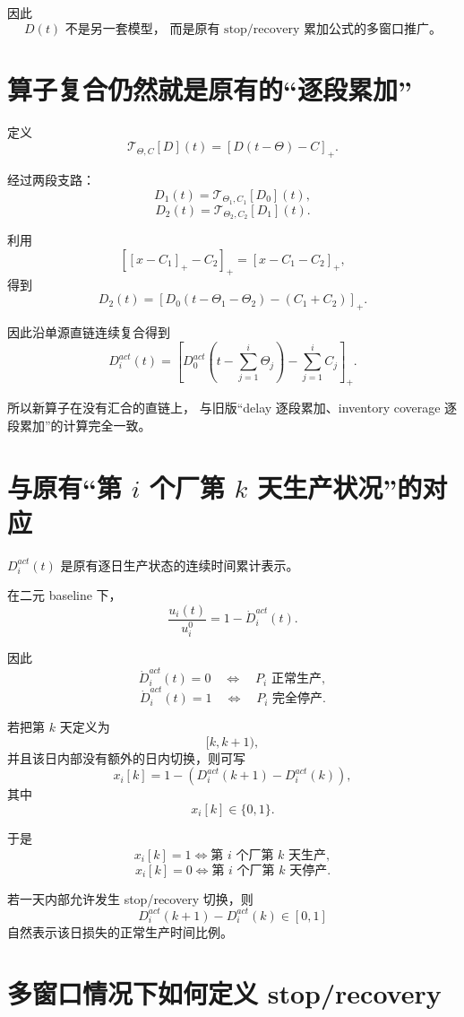 \documentclass[UTF8,11pt]{ctexart}
\begin{document}
因此
\[
\boxed{
\text{\(D(t)\) 不是另一套模型，
而是原有 stop/recovery 累加公式的多窗口推广。}
}
\tag{25}
\]

\section{算子复合仍然就是原有的“逐段累加”}

定义
\[
\mathcal T_{\Theta,C}[D](t)
=
[D(t-\Theta)-C]_+.
\]

经过两段支路：
\[
D_1(t)
=
\mathcal T_{\Theta_1,C_1}[D_0](t),
\]
\[
D_2(t)
=
\mathcal T_{\Theta_2,C_2}[D_1](t).
\]

利用
\[
[[x-C_1]_+-C_2]_+
=
[x-C_1-C_2]_+,
\]
得到
\[
\boxed{
D_2(t)
=
\left[
D_0(t-\Theta_1-\Theta_2)
-(C_1+C_2)
\right]_+.
}
\tag{26}
\]

因此沿单源直链连续复合得到
\[
\boxed{
D_i^{act}(t)
=
\left[
D_0^{act}
\left(
t-\sum_{j=1}^{i}\Theta_j
\right)
-
\sum_{j=1}^{i}C_j
\right]_+.
}
\tag{27}
\]

所以新算子在没有汇合的直链上，
与旧版“delay 逐段累加、inventory coverage 逐段累加”的计算完全一致。

\section{与原有“第 \(i\) 个厂第 \(k\) 天生产状况”的对应}

\(D_i^{act}(t)\) 是原有逐日生产状态的连续时间累计表示。

在二元 baseline 下，
\[
\boxed{
\frac{u_i(t)}{u_i^0}
=
1-\dot D_i^{act}(t).
}
\tag{28}
\]

因此
\[
\dot D_i^{act}(t)=0
\quad\Longleftrightarrow\quad
P_i\text{ 正常生产},
\]
\[
\dot D_i^{act}(t)=1
\quad\Longleftrightarrow\quad
P_i\text{ 完全停产}.
\]

若把第 \(k\) 天定义为
\[
[k,k+1),
\]
并且该日内部没有额外的日内切换，则可写
\[
\boxed{
x_i[k]
=
1-
\left(
D_i^{act}(k+1)-D_i^{act}(k)
\right),
}
\tag{29}
\]
其中
\[
x_i[k]\in\{0,1\}.
\]

于是
\[
\boxed{
x_i[k]=1
\Longleftrightarrow
\text{第 \(i\) 个厂第 \(k\) 天生产},
}
\]
\[
\boxed{
x_i[k]=0
\Longleftrightarrow
\text{第 \(i\) 个厂第 \(k\) 天停产}.
}
\]

若一天内部允许发生 stop/recovery 切换，则
\[
D_i^{act}(k+1)-D_i^{act}(k)\in[0,1]
\]
自然表示该日损失的正常生产时间比例。

\section{多窗口情况下如何定义 stop/recovery}
\end{document}
